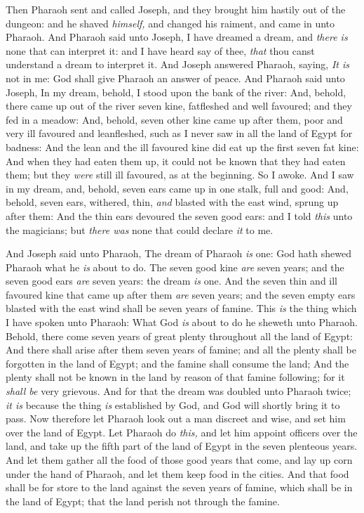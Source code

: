 \documentclass[11pt,letterpaper,oneside]{memoir}
\begin{document}
Then Pharaoh sent and called Joseph, and they brought him hastily out of
the dungeon: and he shaved \emph{himself,} and changed his raiment, and
came in unto Pharaoh. And Pharaoh said unto Joseph, I have dreamed a
dream, and \emph{there is} none that can interpret it: and I have heard
say of thee, \emph{that} thou canst understand a dream to interpret it.
And Joseph answered Pharaoh, saying, \emph{It is} not in me: God shall
give Pharaoh an answer of peace. And Pharaoh said unto Joseph, In my
dream, behold, I stood upon the bank of the river: And, behold, there
came up out of the river seven kine, fatfleshed and well favoured; and
they fed in a meadow: And, behold, seven other kine came up after them,
poor and very ill favoured and leanfleshed, such as I never saw in all
the land of Egypt for badness: And the lean and the ill favoured kine
did eat up the first seven fat kine: And when they had eaten them up, it
could not be known that they had eaten them; but they \emph{were} still
ill favoured, as at the beginning. So I awoke. And I saw in my dream,
and, behold, seven ears came up in one stalk, full and good: And,
behold, seven ears, withered, thin, \emph{and} blasted with the east
wind, sprung up after them: And the thin ears devoured the seven good
ears: and I told \emph{this} unto the magicians; but \emph{there was}
none that could declare \emph{it} to me.

And Joseph said unto Pharaoh, The dream of Pharaoh \emph{is} one: God
hath shewed Pharaoh what he \emph{is} about to do. The seven good kine
\emph{are} seven years; and the seven good ears \emph{are} seven years:
the dream \emph{is} one. And the seven thin and ill favoured kine that
came up after them \emph{are} seven years; and the seven empty ears
blasted with the east wind shall be seven years of famine. This
\emph{is} the thing which I have spoken unto Pharaoh: What God \emph{is}
about to do he sheweth unto Pharaoh. Behold, there come seven years of
great plenty throughout all the land of Egypt: And there shall arise
after them seven years of famine; and all the plenty shall be forgotten
in the land of Egypt; and the famine shall consume the land; And the
plenty shall not be known in the land by reason of that famine
following; for it \emph{shall be} very grievous. And for that the dream
was doubled unto Pharaoh twice; \emph{it is} because the thing \emph{is}
established by God, and God will shortly bring it to pass. Now therefore
let Pharaoh look out a man discreet and wise, and set him over the land
of Egypt. Let Pharaoh do \emph{this,} and let him appoint officers over
the land, and take up the fifth part of the land of Egypt in the seven
plenteous years. And let them gather all the food of those good years
that come, and lay up corn under the hand of Pharaoh, and let them keep
food in the cities. And that food shall be for store to the land against
the seven years of famine, which shall be in the land of Egypt; that the
land perish not through the famine.
\end{document}
